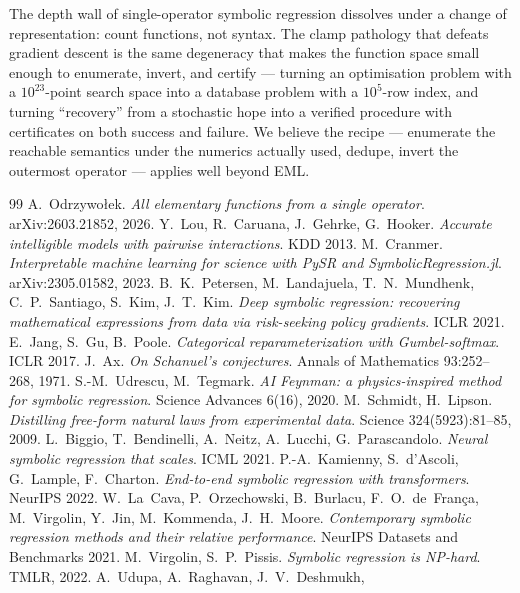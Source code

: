 \documentclass[11pt]{article}
\begin{document}
The depth wall of single-operator symbolic regression dissolves under
a change of representation: count functions, not syntax. The clamp
pathology that defeats gradient descent is the same degeneracy that
makes the function space small enough to enumerate, invert, and
certify — turning an optimisation problem with a $10^{23}$-point
search space into a database problem with a $10^{5}$-row index, and
turning ``recovery'' from a stochastic hope into a verified
procedure with certificates on both success and failure. We believe
the recipe — enumerate the reachable semantics under the numerics
actually used, dedupe, invert the outermost operator — applies well
beyond EML.

\begin{thebibliography}{99}
 A.~Odrzywo{\l}ek.
\emph{All elementary functions from a single operator}.
arXiv:2603.21852, 2026.
 Y.~Lou, R.~Caruana, J.~Gehrke, G.~Hooker.
\emph{Accurate intelligible models with pairwise interactions}. KDD 2013.
 M.~Cranmer.
\emph{Interpretable machine learning for science with PySR and
SymbolicRegression.jl}. arXiv:2305.01582, 2023.
 B.~K.~Petersen, M.~Landajuela, T.~N.~Mundhenk,
C.~P.~Santiago, S.~Kim, J.~T.~Kim.
\emph{Deep symbolic regression: recovering mathematical expressions
from data via risk-seeking policy gradients}. ICLR 2021.
 E.~Jang, S.~Gu, B.~Poole.
\emph{Categorical reparameterization with Gumbel-softmax}. ICLR 2017.
 J.~Ax. \emph{On Schanuel's conjectures}. Annals of
Mathematics 93:252--268, 1971.
 S.-M.~Udrescu, M.~Tegmark.
\emph{AI Feynman: a physics-inspired method for symbolic regression}.
Science Advances 6(16), 2020.
 M.~Schmidt, H.~Lipson.
\emph{Distilling free-form natural laws from experimental data}.
Science 324(5923):81--85, 2009.
 L.~Biggio, T.~Bendinelli, A.~Neitz, A.~Lucchi,
G.~Parascandolo. \emph{Neural symbolic regression that scales}.
ICML 2021.
 P.-A.~Kamienny, S.~d'Ascoli, G.~Lample,
F.~Charton. \emph{End-to-end symbolic regression with transformers}.
NeurIPS 2022.
 W.~La~Cava, P.~Orzechowski, B.~Burlacu,
F.~O.~de~Fran\c{c}a, M.~Virgolin, Y.~Jin, M.~Kommenda, J.~H.~Moore.
\emph{Contemporary symbolic regression methods and their relative
performance}. NeurIPS Datasets and Benchmarks 2021.
 M.~Virgolin, S.~P.~Pissis.
\emph{Symbolic regression is NP-hard}. TMLR, 2022.
 A.~Udupa, A.~Raghavan, J.~V.~Deshmukh,

\end{thebibliography}
\end{document}
